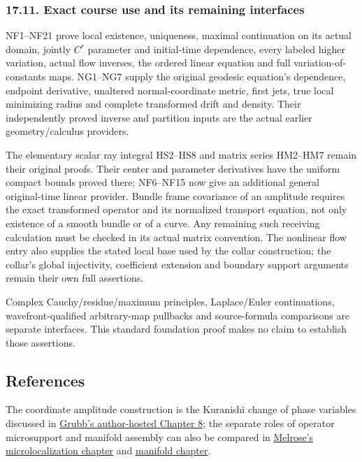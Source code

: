 \documentclass[
  11pt,
]{article}
\begin{document}
\subsubsection{17.11. Exact course use and its remaining
interfaces}\label{exact-course-use-and-its-remaining-interfaces}

NF1--NF21 prove local existence, uniqueness, maximal continuation on its
actual domain, jointly \(C^r\) parameter and initial-time dependence,
every labeled higher variation, actual flow inverses, the ordered linear
equation and full variation-of-constants maps. NG1--NG7 supply the
original geodesic equation's dependence, endpoint derivative, unaltered
normal-coordinate metric, first jets, true local minimizing radius and
complete transformed drift and density. Their independently proved
inverse and partition inputs are the actual earlier geometry/calculus
providers.

The elementary scalar ray integral HS2--HS8 and matrix series HM2--HM7
remain their original proofs. Their center and parameter derivatives
have the uniform compact bounds proved there; NF6--NF15 now give an
additional general original-time linear provider. Bundle frame
covariance of an amplitude requires the exact transformed operator and
its normalized transport equation, not only existence of a smooth bundle
or of a curve. Any remaining such receiving calculation must be checked
in its actual matrix convention. The nonlinear flow entry also supplies
the stated local base used by the collar construction; the collar's
global injectivity, coefficient extension and boundary support arguments
remain their own full assertions.

Complex Cauchy/residue/maximum principles, Laplace/Euler continuations,
wavefront-qualified arbitrary-map pullbacks and source-formula
comparisons are separate interfaces. This standard foundation proof
makes no claim to establish those assertions.

\subsection{References}\label{references}

The coordinate amplitude construction is the Kuranishi change of phase
variables discussed in
\href{https://web.math.ku.dk/~grubb/dist8n.pdf}{Grubb's author-hosted
Chapter 8}; the separate roles of operator microsupport and manifold
assembly can also be compared in
\href{https://math.mit.edu/~rbm/iml/Chapter5.pdf}{Melrose's
microlocalization chapter} and
\href{https://math.mit.edu/~rbm/iml/Chapter6.pdf}{manifold chapter}.
\end{document}

